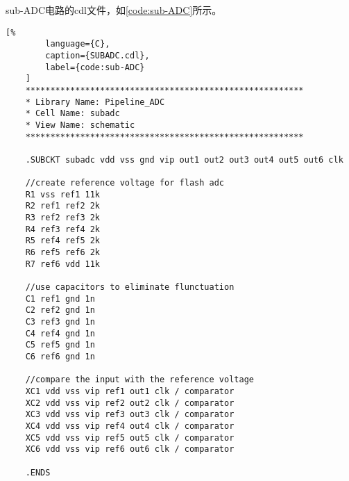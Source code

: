     \par sub-ADC电路的cdl文件，如\autoref{code:sub-ADC}所示。
    \begin{lstlisting}[%
        language={C},
        caption={SUBADC.cdl},
        label={code:sub-ADC}
    ]
    ********************************************************
    * Library Name: Pipeline_ADC
    * Cell Name: subadc
    * View Name: schematic
    ********************************************************

    .SUBCKT subadc vdd vss gnd vip out1 out2 out3 out4 out5 out6 clk

    //create reference voltage for flash adc
    R1 vss ref1 11k
    R2 ref1 ref2 2k
    R3 ref2 ref3 2k
    R4 ref3 ref4 2k
    R5 ref4 ref5 2k
    R6 ref5 ref6 2k
    R7 ref6 vdd 11k

    //use capacitors to eliminate flunctuation
    C1 ref1 gnd 1n
    C2 ref2 gnd 1n
    C3 ref3 gnd 1n
    C4 ref4 gnd 1n
    C5 ref5 gnd 1n
    C6 ref6 gnd 1n

    //compare the input with the reference voltage
    XC1 vdd vss vip ref1 out1 clk / comparator
    XC2 vdd vss vip ref2 out2 clk / comparator
    XC3 vdd vss vip ref3 out3 clk / comparator
    XC4 vdd vss vip ref4 out4 clk / comparator
    XC5 vdd vss vip ref5 out5 clk / comparator
    XC6 vdd vss vip ref6 out6 clk / comparator

    .ENDS
    \end{lstlisting}


